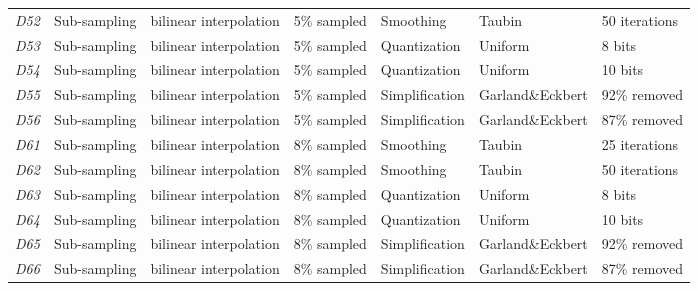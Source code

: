 \begin{table}[]
\begin{tabular}{lllllll}
\textit{D52} & Sub-sampling & bilinear interpolation       & 5\% sampled  & Smoothing      & Taubin                        & 50 iterations  \\
\textit{D53} & Sub-sampling & bilinear interpolation       & 5\% sampled  & Quantization   & Uniform                       & 8 bits         \\
\textit{D54} & Sub-sampling & bilinear interpolation       & 5\% sampled  & Quantization   & Uniform                       & 10 bits        \\
\textit{D55} & Sub-sampling & bilinear interpolation       & 5\% sampled  & Simplification & Garland\&Eckbert  \cite{Garland_1997}            & 92\% removed   \\
\textit{D56} & Sub-sampling & bilinear interpolation       & 5\% sampled  & Simplification & Garland\&Eckbert  \cite{Garland_1997}            & 87\% removed   \\
\textit{D61} & Sub-sampling & bilinear interpolation       & 8\% sampled  & Smoothing      & Taubin                        & 25  iterations \\
\textit{D62} & Sub-sampling & bilinear interpolation       & 8\% sampled  & Smoothing      & Taubin                        & 50 iterations  \\
\textit{D63} & Sub-sampling & bilinear interpolation       & 8\% sampled  & Quantization   & Uniform                       & 8 bits         \\
\textit{D64} & Sub-sampling & bilinear interpolation       & 8\% sampled  & Quantization   & Uniform                       & 10 bits        \\
\textit{D65} & Sub-sampling & bilinear interpolation       & 8\% sampled  & Simplification & Garland\&Eckbert  \cite{Garland_1997}            & 92\% removed   \\
\textit{D66} & Sub-sampling & bilinear interpolation       & 8\% sampled  & Simplification & Garland\&Eckbert  \cite{Garland_1997}            & 87\% removed  
\end{tabular}
\end{table}

